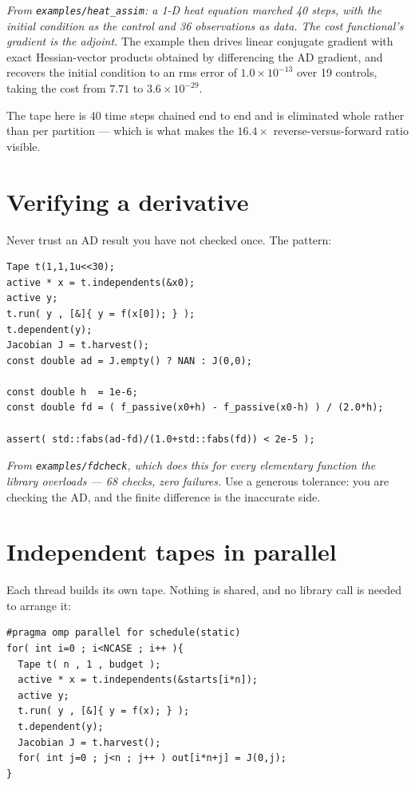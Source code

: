 \documentclass[11pt,a4paper]{report}
\newcommand{\code}[1]{\texttt{#1}}
\begin{document}
\noindent
\emph{From \code{examples/heat\_assim}: a 1-D heat equation marched 40 steps,
with the initial condition as the control and 36 observations as data. The cost
functional's gradient is the adjoint.} The example then drives linear conjugate
gradient with exact Hessian-vector products obtained by differencing the AD
gradient, and recovers the initial condition to an rms error of
$1.0\times10^{-13}$ over 19 controls, taking the cost from $7.71$ to
$3.6\times10^{-29}$.

The tape here is 40 time steps chained end to end and is eliminated whole rather
than per partition --- which is what makes the $16.4\times$ reverse-versus-forward
ratio visible.

\section{Verifying a derivative}

Never trust an AD result you have not checked once. The pattern:

\begin{lstlisting}
Tape t(1,1,1u<<30);
active * x = t.independents(&x0);
active y;
t.run( y , [&]{ y = f(x[0]); } );
t.dependent(y);
Jacobian J = t.harvest();
const double ad = J.empty() ? NAN : J(0,0);

const double h  = 1e-6;
const double fd = ( f_passive(x0+h) - f_passive(x0-h) ) / (2.0*h);

assert( std::fabs(ad-fd)/(1.0+std::fabs(fd)) < 2e-5 );
\end{lstlisting}

\noindent
\emph{From \code{examples/fdcheck}, which does this for every elementary function
the library overloads --- 68 checks, zero failures.} Use a generous tolerance:
you are checking the AD, and the finite difference is the inaccurate side.

\section{Independent tapes in parallel}
\label{sec:parallel}

Each thread builds its own tape. Nothing is shared, and no library call is
needed to arrange it:

\begin{lstlisting}
#pragma omp parallel for schedule(static)
for( int i=0 ; i<NCASE ; i++ ){
  Tape t( n , 1 , budget );
  active * x = t.independents(&starts[i*n]);
  active y;
  t.run( y , [&]{ y = f(x); } );
  t.dependent(y);
  Jacobian J = t.harvest();
  for( int j=0 ; j<n ; j++ ) out[i*n+j] = J(0,j);
}
\end{lstlisting}
\end{document}

